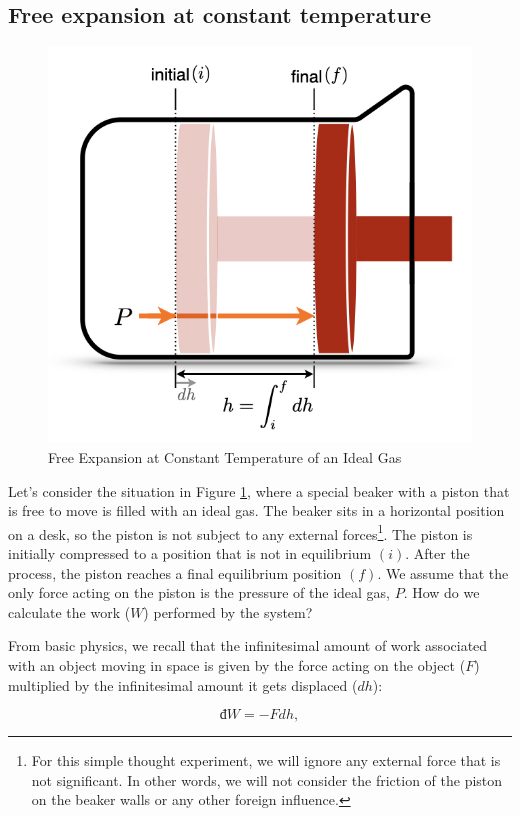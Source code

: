 \documentclass[
]{book}
\theoremstyle{definition}
\theoremstyle{definition}
\theoremstyle{definition}
\theoremstyle{remark}
\begin{document}
\hypertarget{free-expansion-at-constant-temperature}{%
\subsection{Free expansion at constant temperature}\label{free-expansion-at-constant-temperature}}

\begin{figure}

{\centering \includegraphics[width=0.5\linewidth]{./img/OEP_Figures.003} 

}

\caption{Free Expansion at Constant Temperature of an Ideal Gas}\label{fig:Fig1c3}
\end{figure}

Let's consider the situation in Figure \ref{fig:Fig1c3}, where a special beaker with a piston that is free to move is filled with an ideal gas. The beaker sits in a horizontal position on a desk, so the piston is not subject to any external forces\footnote{For this simple thought experiment, we will ignore any external force that is not significant. In other words, we will not consider the friction of the piston on the beaker walls or any other foreign influence.}. The piston is initially compressed to a position that is not in equilibrium \((i)\). After the process, the piston reaches a final equilibrium position \((f)\). We assume that the only force acting on the piston is the pressure of the ideal gas, \(P\). How do we calculate the work (\(W\)) performed by the system?

From basic physics, we recall that the infinitesimal amount of work associated with an object moving in space is given by the force acting on the object (\(F\)) multiplied by the infinitesimal amount it gets displaced (\(d h\)):

\begin{equation}
  đ W = - Fdh,
  \label{eq:Wphysics}
\end{equation}
\end{document}
